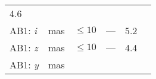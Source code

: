 \documentclass[DM, lsstdraft, toc]{lsstdoc}
\begin{document}
\begin{longtable}[]{@{}llllll@{}}
\begin{minipage}[t]{0.12\columnwidth}
4.6\strut
\end{minipage} & \begin{minipage}[t]{0.17\columnwidth}\raggedright\strut
\strut
\end{minipage}\tabularnewline
\begin{minipage}[t]{0.12\columnwidth}\raggedright\strut
AB1: \emph{i}\strut
\end{minipage} & \begin{minipage}[t]{0.06\columnwidth}\raggedright\strut
mas\strut
\end{minipage} & \begin{minipage}[t]{0.14\columnwidth}\raggedright\strut
\(\leq 10\)\strut
\end{minipage} & \begin{minipage}[t]{0.12\columnwidth}\raggedright\strut
---\strut
\end{minipage} & \begin{minipage}[t]{0.12\columnwidth}\raggedright\strut
5.2\strut
\end{minipage} & \begin{minipage}[t]{0.17\columnwidth}\raggedright\strut
\strut
\end{minipage}\tabularnewline
\begin{minipage}[t]{0.12\columnwidth}\raggedright\strut
AB1: \emph{z}\strut
\end{minipage} & \begin{minipage}[t]{0.06\columnwidth}\raggedright\strut
mas\strut
\end{minipage} & \begin{minipage}[t]{0.14\columnwidth}\raggedright\strut
\(\leq 10\)\strut
\end{minipage} & \begin{minipage}[t]{0.12\columnwidth}\raggedright\strut
---\strut
\end{minipage} & \begin{minipage}[t]{0.12\columnwidth}\raggedright\strut
4.4\strut
\end{minipage} & \begin{minipage}[t]{0.17\columnwidth}\raggedright\strut
\strut
\end{minipage}\tabularnewline
\begin{minipage}[t]{0.12\columnwidth}\raggedright\strut
AB1: \emph{y}\strut
\end{minipage} & \begin{minipage}[t]{0.06\columnwidth}\raggedright\strut
mas\strut
\end{minipage} & \begin{minipage}[t]{0.14\columnwidth}\raggedright\strut

\end{minipage}
\end{longtable}
\end{document}
